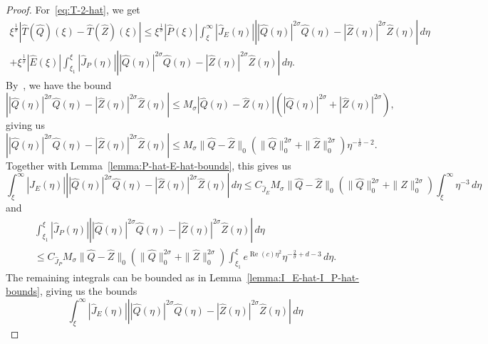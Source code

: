 \documentclass[11pt]{article}
\DeclareMathOperator{\real}{Re}
\begin{document}
\begin{proof}
  For~\eqref{eq:T-2-hat}, we get
  \begin{multline*}
    \xi^{\frac{1}{\sigma}}|\hat{T}(\hat{Q})(\xi) - \hat{T}(\hat{Z})(\xi)|
    \leq \xi^{\frac{1}{\sigma}}|\hat{P}(\xi)|
    \int_{\xi}^{\infty}|\hat{J}_{E}(\eta)|\left||\hat{Q}(\eta)|^{2\sigma}\hat{Q}(\eta) - |\hat{Z}(\eta)|^{2\sigma}\hat{Z}(\eta)\right|\,d\eta\\
    + \xi^{\frac{1}{\sigma}}|\hat{E}(\xi)|
    \int_{\xi_{1}}^{\xi}|\hat{J}_{P}(\eta)|\left||\hat{Q}(\eta)|^{2\sigma}\hat{Q}(\eta) - |\hat{Z}(\eta)|^{2\sigma}\hat{Z}(\eta)\right|\,d\eta.
  \end{multline*}
  By~\cite[Lemma~A.7]{Dahne2024}, we have the bound
  \begin{equation*}
    \left||\hat{Q}(\eta)|^{2\sigma}\hat{Q}(\eta) - |\hat{Z}(\eta)|^{2\sigma}\hat{Z}(\eta)\right|
    \leq M_{\sigma} |\hat{Q}(\eta) - \hat{Z}(\eta)|(|\hat{Q}(\eta)|^{2\sigma} + |\hat{Z}(\eta)|^{2\sigma}),
  \end{equation*}
  giving us
  \begin{equation*}
    \left||\hat{Q}(\eta)|^{2\sigma}\hat{Q}(\eta) - |\hat{Z}(\eta)|^{2\sigma}\hat{Z}(\eta)\right|
    \leq M_{\sigma} \|\hat{Q} - \hat{Z}\|_{0}(\|\hat{Q}\|_{0}^{2\sigma} + \|\hat{Z}\|_{0}^{2\sigma})\eta^{-\frac{1}{\sigma} - 2}.
  \end{equation*}
  Together with Lemma~\ref{lemma:P-hat-E-hat-bounds}, this gives us
  \begin{equation*}
    \int_{\xi}^{\infty}|\hat{J}_{E}(\eta)|\left||\hat{Q}(\eta)|^{2\sigma}\hat{Q}(\eta) - |\hat{Z}(\eta)|^{2\sigma}\hat{Z}(\eta)\right|\,d\eta
    \leq C_{\hat{J}_{E}}M_{\sigma} \|\hat{Q} - \hat{Z}\|_{0}(\|\hat{Q}\|_{0}^{2\sigma} + \|\hat{Z}\|_{0}^{2\sigma})
    \int_{\xi}^{\infty}\eta^{-3}\,d\eta
  \end{equation*}
  and
  \begin{multline*}
    \int_{\xi_{1}}^{\xi}|\hat{J}_{P}(\eta)|\left||\hat{Q}(\eta)|^{2\sigma}\hat{Q}(\eta) - |\hat{Z}(\eta)|^{2\sigma}\hat{Z}(\eta)\right|\,d\eta\\
    \leq C_{\hat{J}_{P}}M_{\sigma} \|\hat{Q} - \hat{Z}\|_{0}(\|\hat{Q}\|_{0}^{2\sigma} + \|\hat{Z}\|_{0}^{2\sigma})
    \int_{\xi_{1}}^{\xi}e^{\real(c)\eta^{2}}\eta^{-\frac{2}{\sigma} + d - 3}\,d\eta.
  \end{multline*}
  The remaining integrals can be bounded as in
  Lemma~\ref{lemma:I_E-hat-I_P-hat-bounds}, giving us the bounds
  \begin{equation*}
    \int_{\xi}^{\infty}|\hat{J}_{E}(\eta)|\left||\hat{Q}(\eta)|^{2\sigma}\hat{Q}(\eta) - |\hat{Z}(\eta)|^{2\sigma}\hat{Z}(\eta)\right|\,d\eta

\end{equation*}
\end{proof}
\end{document}
